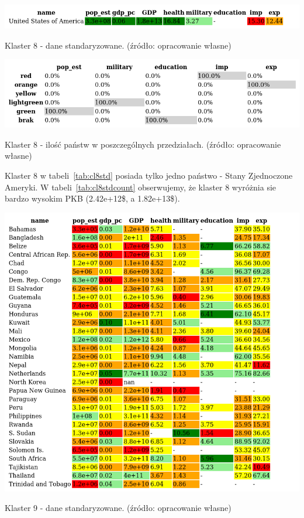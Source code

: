 \documentclass[11pt]{report}
\begin{document}
    \begin{table}[!htp]
        \centering
        \includegraphics[width=\linewidth]{tables/CLUST/cluster8stdkmeans.png}
        \caption{Klaster 8 - dane standaryzowane. (źródło: opracowanie własne)}
        \label{tab:cl8std}
    \end{table}

    \begin{table}[!htp]
        \centering
        \includegraphics[width=\linewidth]{tables/CLUST/cluster8stdkmeanscount.png}
        \caption{Klaster 8 - ilość państw w poszczególnych przedziałach. (źródło: opracowanie własne)}
        \label{tab:cl8stdcount}
    \end{table}

    Klaster 8 w tabeli~\ref{tab:cl8std} posiada tylko jedno państwo - Stany Zjednoczone Ameryki.
    W tabeli~\ref{tab:cl8stdcount} obserwujemy, że klaster 8 wyróżnia sie bardzo wysokim PKB (2.42e+12\$, a 1.82e+13\$).

    \begin{table}[!htp]
        \centering
        \includegraphics[width=\linewidth]{tables/CLUST/cluster9stdkmeans.png}
        \caption{Klaster 9 - dane standaryzowane. (źródło: opracowanie własne)}
        \label{tab:cl9std}
    \end{table}
\end{document}
